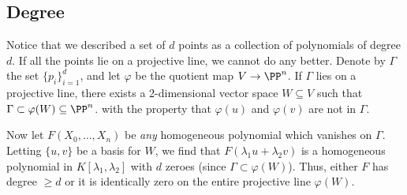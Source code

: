 \subsection{Degree}
Notice that we described a set of $d$ points as a collection of polynomials of degree $d$. If all the points lie on a projective line, we cannot do any better. Denote by $\Gamma$ the set $\{p_i\}_{i=1}^d$, and let $\varphi$ be the quotient map $V\to\PP^n$. If $\Gamma$ lies on a projective line, there exists a 2-dimensional vector space $W\subseteq V$ such that $\Gamma\subset\varphi(W)\subseteq\PP^n$.  with the property that $\varphi(u)$ and $\varphi(v)$ are not in $\Gamma$.

Now let $F(X_0,\ldots,X_n)$ be \emph{any} homogeneous polynomial which vanishes on $\Gamma$. Letting $\{u, v\}$ be a basis for $W$, we find that $F(\lambda_1 u + \lambda_2 v)$ is a homogeneous polynomial in $K[\lambda_1,\lambda_2]$ with $d$ zeroes (since $\Gamma\subset\varphi(W)$). Thus, either $F$ has degree $\geq d$ or it is identically zero on the entire projective line $\varphi(W)$.


